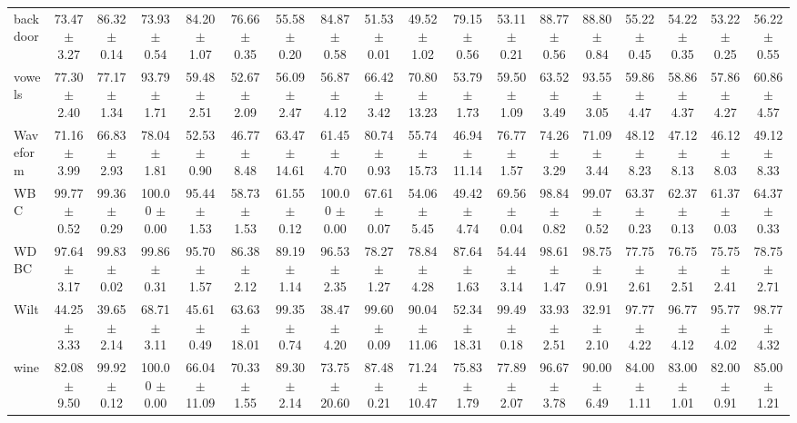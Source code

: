 \begin{table}[ht]
\begin{adjustbox}{max width=\textwidth}
\begin{tabular}{lccccccccccccccccc}
        backdoor &  73.47 $\pm$ 3.27 &  86.32 $\pm$ 0.14 &  73.93 $\pm$ 0.54 &  84.20 $\pm$ 1.07 &  76.66 $\pm$ 0.35 &  55.58 $\pm$ 0.20 &  84.87 $\pm$ 0.58 & 51.53 $\pm$ 0.01 &  49.52 $\pm$ 1.02 &  79.15 $\pm$ 0.56 &  53.11 $\pm$ 0.21 &  88.77 $\pm$ 0.56 &  88.80 $\pm$ 0.84 &  55.22 $\pm$ 0.45 &  54.22 $\pm$ 0.35 &  53.22 $\pm$ 0.25 &  56.22 $\pm$ 0.55 \\
          vowels &  77.30 $\pm$ 2.40 &  77.17 $\pm$ 1.34 &  93.79 $\pm$ 1.71 &  59.48 $\pm$ 2.51 &  52.67 $\pm$ 2.09 &  56.09 $\pm$ 2.47 &  56.87 $\pm$ 4.12 & 66.42 $\pm$ 3.42 & 70.80 $\pm$ 13.23 &  53.79 $\pm$ 1.73 &  59.50 $\pm$ 1.09 &  63.52 $\pm$ 3.49 &  93.55 $\pm$ 3.05 &  59.86 $\pm$ 4.47 &  58.86 $\pm$ 4.37 &  57.86 $\pm$ 4.27 &  60.86 $\pm$ 4.57 \\
        Waveform &  71.16 $\pm$ 3.99 &  66.83 $\pm$ 2.93 &  78.04 $\pm$ 1.81 &  52.53 $\pm$ 0.90 &  46.77 $\pm$ 8.48 & 63.47 $\pm$ 14.61 &  61.45 $\pm$ 4.70 & 80.74 $\pm$ 0.93 & 55.74 $\pm$ 15.73 & 46.94 $\pm$ 11.14 &  76.77 $\pm$ 1.57 &  74.26 $\pm$ 3.29 &  71.09 $\pm$ 3.44 &  48.12 $\pm$ 8.23 &  47.12 $\pm$ 8.13 &  46.12 $\pm$ 8.03 &  49.12 $\pm$ 8.33 \\
             WBC &  99.77 $\pm$ 0.52 &  99.36 $\pm$ 0.29 & 100.00 $\pm$ 0.00 &  95.44 $\pm$ 1.53 &  58.73 $\pm$ 1.53 &  61.55 $\pm$ 0.12 & 100.00 $\pm$ 0.00 & 67.61 $\pm$ 0.07 &  54.06 $\pm$ 5.45 &  49.42 $\pm$ 4.74 &  69.56 $\pm$ 0.04 &  98.84 $\pm$ 0.82 &  99.07 $\pm$ 0.52 &  63.37 $\pm$ 0.23 &  62.37 $\pm$ 0.13 &  61.37 $\pm$ 0.03 &  64.37 $\pm$ 0.33 \\
            WDBC &  97.64 $\pm$ 3.17 &  99.83 $\pm$ 0.02 &  99.86 $\pm$ 0.31 &  95.70 $\pm$ 1.57 &  86.38 $\pm$ 2.12 &  89.19 $\pm$ 1.14 &  96.53 $\pm$ 2.35 & 78.27 $\pm$ 1.27 &  78.84 $\pm$ 4.28 &  87.64 $\pm$ 1.63 &  54.44 $\pm$ 3.14 &  98.61 $\pm$ 1.47 &  98.75 $\pm$ 0.91 &  77.75 $\pm$ 2.61 &  76.75 $\pm$ 2.51 &  75.75 $\pm$ 2.41 &  78.75 $\pm$ 2.71 \\
            Wilt &  44.25 $\pm$ 3.33 &  39.65 $\pm$ 2.14 &  68.71 $\pm$ 3.11 &  45.61 $\pm$ 0.49 & 63.63 $\pm$ 18.01 &  99.35 $\pm$ 0.74 &  38.47 $\pm$ 4.20 & 99.60 $\pm$ 0.09 & 90.04 $\pm$ 11.06 & 52.34 $\pm$ 18.31 &  99.49 $\pm$ 0.18 &  33.93 $\pm$ 2.51 &  32.91 $\pm$ 2.10 &  97.77 $\pm$ 4.22 &  96.77 $\pm$ 4.12 &  95.77 $\pm$ 4.02 &  98.77 $\pm$ 4.32 \\
            wine &  82.08 $\pm$ 9.50 &  99.92 $\pm$ 0.12 & 100.00 $\pm$ 0.00 & 66.04 $\pm$ 11.09 &  70.33 $\pm$ 1.55 &  89.30 $\pm$ 2.14 & 73.75 $\pm$ 20.60 & 87.48 $\pm$ 0.21 & 71.24 $\pm$ 10.47 &  75.83 $\pm$ 1.79 &  77.89 $\pm$ 2.07 &  96.67 $\pm$ 3.78 &  90.00 $\pm$ 6.49 &  84.00 $\pm$ 1.11 &  83.00 $\pm$ 1.01 &  82.00 $\pm$ 0.91 &  85.00 $\pm$ 1.21 \\

\end{tabular}
\end{adjustbox}
\end{table}
